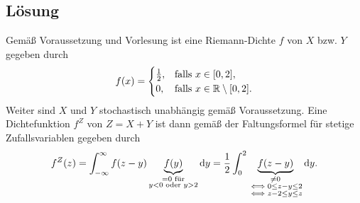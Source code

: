 \documentclass{exercise}
\begin{document}
    \subsection*{Lösung}
    Gemäß Voraussetzung und Vorlesung ist eine Riemann-Dichte \(f\) von \(X\) bzw. \(Y\) gegeben durch
    \[
        f\parentheses*{x} = \begin{cases}
            \frac{1}{2}, & \text{falls }x \in \brackets*{0, 2},\\
            0, & \text{falls }x \in \R \setminus \brackets*{0, 2}.
        \end{cases}
    \]
    Weiter sind \(X\) und \(Y\) stochastisch unabhängig gemäß Voraussetzung.
    Eine Dichtefunktion \(f^Z\) von \(Z = X + Y\) ist dann gemäß der Faltungsformel für stetige Zufallsvariablen gegeben durch
    \[
        f^Z\parentheses*{z} = \int_{-\infty}^\infty f\parentheses*{z - y}\underbrace{f\parentheses*{y}}_{\substack{= 0\text{ für}\\y < 0\text{ oder }y > 2}}\d y = \frac{1}{2}\int_0^2 \underbrace{f\parentheses*{z - y}}_{\substack{\ne 0\\\iff 0 \le z - y \le 2\\\iff z - 2 \le y \le z}}\d y.
    \]
\end{document}
